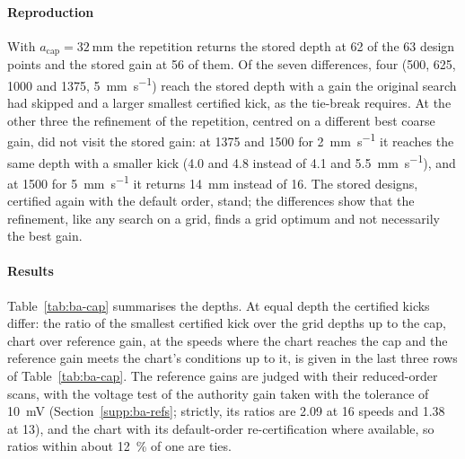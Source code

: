 \paragraph{Reproduction} With $a_{\mathrm{cap}}=\SI{32}{\milli\metre}$ the repetition returns the stored depth at 62 of the 63 design points and the stored gain at 56 of them. Of the seven differences, four (500, 625, 1000 and \SI{1375}{\rpm}, \SI{5}{\milli\metre\per\second}) reach the stored depth with a gain the original search had skipped and a larger smallest certified kick, as the tie-break requires. At the other three the refinement of the repetition, centred on a different best coarse gain, did not visit the stored gain: at 1375 and \SI{1500}{\rpm} for \SI{2}{\milli\metre\per\second} it reaches the same depth with a smaller kick (4.0 and 4.8 instead of 4.1 and \SI{5.5}{\milli\metre\per\second}), and at \SI{1500}{\rpm} for \SI{5}{\milli\metre\per\second} it returns \SI{14}{\milli\metre} instead of 16. The stored designs, certified again with the default order, stand; the differences show that the refinement, like any search on a grid, finds a grid optimum and not necessarily the best gain.

\paragraph{Results} Table~\ref{tab:ba-cap} summarises the depths. At equal depth the certified kicks differ: the ratio of the smallest certified kick over the grid depths up to the cap, chart over reference gain, at the speeds where the chart reaches the cap and the reference gain meets the chart's conditions up to it, is given in the last three rows of Table~\ref{tab:ba-cap}. The reference gains are judged with their reduced-order scans, with the voltage test of the authority gain taken with the tolerance of \SI{10}{\milli\volt} (Section~\ref{supp:ba-refs}; strictly, its ratios are 2.09 at 16 speeds and 1.38 at 13), and the chart with its default-order re-certification where available, so ratios within about \SI{12}{\percent} of one are ties.

